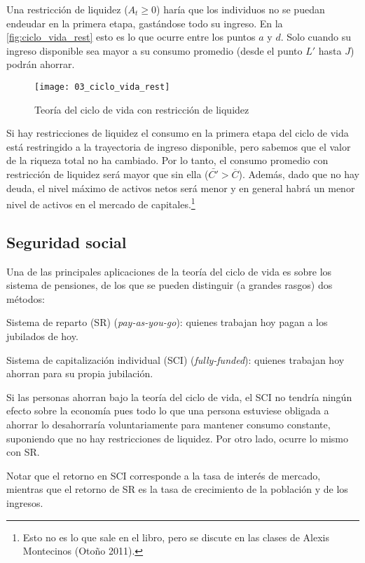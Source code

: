 \documentclass[DeGregorioResumen]{subfiles}
\begin{document}
Una restricción de liquidez ($A_t\geq0$) haría que los individuos no se puedan endeudar en la primera etapa, gastándose todo su ingreso. En la \autoref{fig:ciclo_vida_rest} esto es lo que ocurre entre los puntos $a$ y $d$. Solo cuando su ingreso disponible sea mayor a su consumo promedio (desde el punto $L'$ hasta $J$) podrán ahorrar.

\begin{figure}[H]
  \centering
  \texttt{[image: 03\_ciclo\_vida\_rest]}
  \caption{Teoría del ciclo de vida con restricción de liquidez}
  \label{fig:ciclo_vida_rest}
\end{figure}

Si hay restricciones de liquidez el consumo en la primera etapa del ciclo de vida está restringido a la trayectoria de ingreso disponible, pero sabemos que el valor de la riqueza total no ha cambiado. Por lo tanto, el consumo promedio con restricción de liquidez será mayor que sin ella ($\bar{C'}>\overline{C}$). Además, dado que no hay deuda, el nivel máximo de activos netos será menor y en general habrá un menor nivel de activos en el mercado de capitales.\footnote{Esto no es lo que sale en el libro, pero se discute en las clases de Alexis Montecinos (Otoño 2011).}

\subsection{Seguridad social}

Una de las principales aplicaciones de la teoría del ciclo de vida es sobre los sistema de pensiones, de los que se pueden distinguir (a grandes rasgos) dos métodos:

\begin{enumdescript}
\item[Sistema de reparto (SR)] (\textit{pay-as-you-go}): quienes trabajan hoy pagan a los jubilados de hoy.
\item[Sistema de capitalización individual (SCI)] (\textit{fully-funded}): quienes trabajan hoy ahorran para su propia jubilación.
\end{enumdescript}

Si las personas ahorran bajo la teoría del ciclo de vida, el SCI no tendría ningún efecto sobre la economía pues todo lo que una persona estuviese obligada a ahorrar lo desahorraría voluntariamente para mantener consumo constante, suponiendo que no hay restricciones de liquidez. Por otro lado, ocurre lo mismo con SR.

Notar que el retorno en SCI corresponde a la tasa de interés de mercado, mientras que el retorno de SR es la tasa de crecimiento de la población y de los ingresos.
\end{document}
